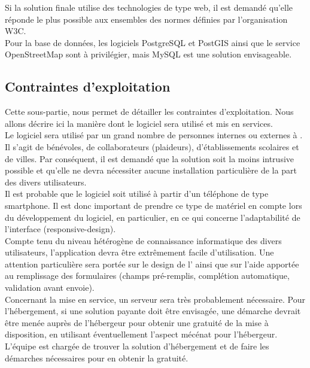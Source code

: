 Si la solution finale utilise des technologies de type web, il est demandé qu'elle réponde le plus possible aux ensembles des normes définies par l'organisation W3C.\\

Pour la base de données, les logiciels PostgreSQL et PostGIS ainsi que le service OpenStreetMap sont à privilégier, mais MySQL est une solution envisageable.\\





\subsection{Contraintes d'exploitation}
Cette sous-partie, nous permet de détailler les contraintes d'exploitation. Nous allons décrire ici la manière dont le logiciel sera utilisé et mis en services.\\

Le logiciel sera utilisé par un grand nombre de personnes internes ou externes à \nomClient{}. Il s'agit de bénévoles, de collaborateurs (plaideurs), d'établissements scolaires et de villes. Par conséquent, il est demandé que la solution soit la moins intrusive possible et qu'elle ne devra nécessiter aucune installation particulière de la part des divers utilisateurs.\\

Il est probable que le logiciel soit utilisé à partir d'un téléphone de type smartphone. Il est donc important de prendre ce type de matériel en compte lors du développement du logiciel, en particulier, en ce qui concerne l'adaptabilité de l'interface (responsive-design).\\

Compte tenu du niveau hétérogène de connaissance informatique des divers utilisateurs, l'application devra être extrêmement facile d'utilisation. Une attention particulière sera portée sur le design de l'\IHM{} ainsi que sur l'aide apportée au remplissage des formulaires (champs pré-remplis, complétion automatique, validation avant envoie).\\

Concernant la mise en service, un serveur sera très probablement nécessaire. Pour l'hébergement, si une solution payante doit être envisagée, une démarche devrait être menée auprès de l'hébergeur pour obtenir une gratuité de la mise à disposition, en utilisant éventuellement l'aspect mécénat pour l'hébergeur. L'équipe \PICCourt{} est chargée de trouver la solution d'hébergement et de faire les démarches nécessaires pour en obtenir la gratuité.\\


